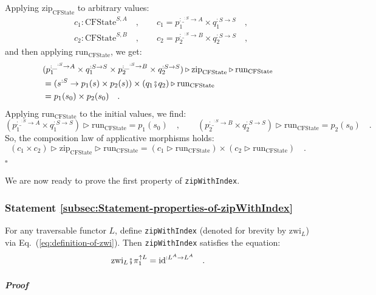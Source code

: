 Applying $\text{zip}_{\text{CFState}}$ to arbitrary values:
\begin{align*}
 & c_{1}:\text{CFState}^{S,A}\quad,\quad\quad c_{1}=p_{1}^{:\_^{:S}\rightarrow A}\times q_{1}^{:S\rightarrow S}\quad,\\
 & c_{2}:\text{CFState}^{S,B}\quad,\quad\quad c_{2}=p_{2}^{:\_^{:S}\rightarrow B}\times q_{2}^{:S\rightarrow S}\quad,
\end{align*}
 and then applying $\text{run}_{\text{CFState}}$, we get:
\begin{align*}
 & (p_{1}^{:\_^{:S}\rightarrow A}\times q_{1}^{:S\rightarrow S}\times p_{2}^{:\_^{:S}\rightarrow B}\times q_{2}^{:S\rightarrow S})\triangleright\text{zip}_{\text{CFState}}\triangleright\text{run}_{\text{CFState}}\\
 & =(s^{:S}\rightarrow p_{1}(s)\times p_{2}(s))\times(q_{1}\bef q_{2})\triangleright\text{run}_{\text{CFState}}\\
 & =p_{1}(s_{0})\times p_{2}(s_{0})\quad.
\end{align*}
Applying $\text{run}_{\text{CFState}}$ to the initial values, we
find:
\[
(p_{1}^{:\_^{:S}\rightarrow A}\times q_{1}^{:S\rightarrow S})\triangleright\text{run}_{\text{CFState}}=p_{1}(s_{0})\quad,\quad\quad(p_{2}^{:\_^{:S}\rightarrow B}\times q_{2}^{:S\rightarrow S})\triangleright\text{run}_{\text{CFState}}=p_{2}(s_{0})\quad.
\]
So, the composition law of applicative morphisms holds:
\[
(c_{1}\times c_{2})\triangleright\text{zip}_{\text{CFState}}\triangleright\text{run}_{\text{CFState}}=(c_{1}\triangleright\text{run}_{\text{CFState}})\times(c_{2}\triangleright\text{run}_{\text{CFState}})\quad.
\]
$\square$

We are now ready to prove the first property of \lstinline!zipWithIndex!.

\subsubsection{Statement \label{subsec:Statement-properties-of-zipWithIndex}\ref{subsec:Statement-properties-of-zipWithIndex}}

For any traversable functor $L$, define \lstinline!zipWithIndex!
(denoted for brevity by $\text{zwi}_{L}$) via Eq.~(\ref{eq:definition-of-zwi}).
Then \lstinline!zipWithIndex! satisfies the equation:
\[
\text{zwi}_{L}\bef\pi_{1}^{\uparrow L}=\text{id}^{:L^{A}\rightarrow L^{A}}\quad.
\]


\subparagraph{Proof}

